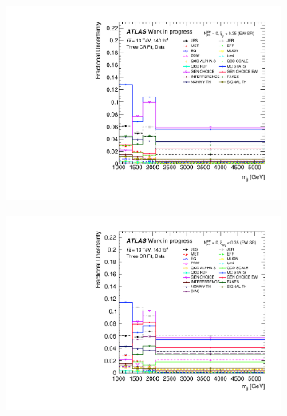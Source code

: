 \begin{figure}[t]
\begin{subfigure}[b]{0.48\textwidth}
    \centering
    \includegraphics[width=\textwidth]{plots/diffx/final/data/3cr/Systematic_Uncertainties_data_mjj_3cr_QCD_Sh2211_0p01sigma.pdf}
    \caption{}
\end{subfigure}
\hfill
\begin{subfigure}[b]{0.48\textwidth}
    \centering
    \includegraphics[width=\textwidth]{plots/diffx/final/unfolded/3cr/Systematic_Uncertainties_data_unfolded_mjj_3cr_QCD_Sh2211_0p01sigma.pdf}
    \caption{}
\end{subfigure}
\begin{subfigure}[b]{0.48\textwidth}
    \centering

\end{subfigure}
\end{figure}

